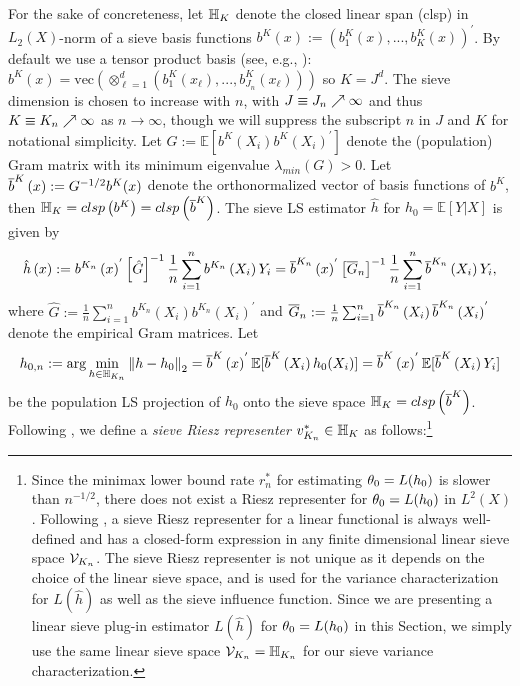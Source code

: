 \documentclass[12pt,american]{article}
\theoremstyle{definition}
\theoremstyle{plain}
\theoremstyle{definition}
\theoremstyle{plain}
\theoremstyle{plain}
\theoremstyle{plain}
\theoremstyle{plain}
\theoremstyle{plain}
\newcommand{\E}{\mathbb{E}}
\newcommand{\norm}[1]{\left\| #1 \right\|}
\begin{document}
For the sake of concreteness, let ${\mathbb{H}}_{K}$ denote the closed linear span (clsp) in $L_2(X)$-norm of a sieve basis functions $b^{K}(x):=\left(b_{1}^{K}(x),...,b_{K}^{K}(x)\right)^{'}$. By default we use a tensor product basis (see, e.g., \cite{chen2007sieve}): $b^{K}(x)=\text{vec}\left(\otimes_{\ell=1}^{d}\left(b_{1}^{K}\left(x_{\ell}\right),...,b_{J_{n}}^{K}\left(x_{\ell}\right)\right)\right)$ so $K=J^d$. The sieve dimension is chosen to increase with $n$, with $J\equiv J_{n}\nearrow\infty$ and thus $K \equiv K_{n}\nearrow\infty$ as $n\to\infty$, though we will suppress
the subscript $n$ in $J$ and $K$ for notational simplicity. Let $G:=\E\left[b^{K}\left(X_{i}\right)b^{K}\left(X_{i}\right)^{'}\right]$ denote the (population) Gram matrix with its minimum eigenvalue $\lambda_{min} (G)>0$. Let $\overline{b}^{K}\left(x\right):=G^{-1/2} b^K(x)$ denote the orthonormalized vector of basis functions of $b^K$, then ${\mathbb{H}}_{K}=clsp\left (b^K\right )=clsp \left(\overline{b}^K \right)$. The sieve LS estimator $\hat{h}$ for $h_0=\E[Y|X]$ is given by
\begin{equation}\label{eq:seriesLS}
  \hat{h}\left(x\right):=b^{K_{n}}\left(x\right)^{'}\left[\hat{G}\right]^{-1}\frac{1}{n}\sum_{i=1}^{n}  b^{K_{n}}\left(X_{i}\right)Y_{i}=\overline{b}^{K_{n}}\left(x\right)^{'}\left[{\overline{G}}_n\right]^{-1}\frac{1}{n}\sum_{i=1}^{n} \overline{b}^{K_{n}}\left(X_{i}\right)Y_{i},
\end{equation}
where $\hat{G}:=\frac{1}{n}\sum_{i=1}^{n} b^{K_{n}}\left(X_{i}\right) b^{K_{n}}\left(X_{i}\right)^{'}$ and ${\overline{G}}_n:=\frac{1}{n}\sum_{i=1}^{n} \overline{b}^{K_{n}}\left(X_{i}\right) \overline{b}^{K_{n}}\left(X_{i}\right)^{'}$ denote the empirical Gram matrices. Let
\[
  h_{0,n}:=\arg\min_{h\in \H_{K_{n}}}\norm{h-h_0}_2 = \ol b^{K}\left(x\right)^{'}\E[\ol b^{K}\left(X_i\right)h_0(X_i)]= \ol b^{K}\left(x\right)^{'}\E[\ol b^{K}\left(X_i\right)Y_i]
\]
be the population LS projection of $h_0$ onto the sieve space ${\mathbb{H}}_{K}=clsp \left(\overline{b}^K \right)$. Following \citet*{chen2014sieve}, we define a \textit{sieve Riesz representer} $v_{K_n}^{*}\in{\mathbb{H}}_{K}$ as follows:\footnote{Since the minimax lower bound rate $r^*_n$ for estimating $\theta_0=L(h_0)$ is slower than $n^{-1/2}$, there does not exist a Riesz representer for $\theta_0=L(h_0)$ in $L^2(X)$. Following \citet*{chen2014sieve}, a sieve Riesz representer for a linear functional is always well-defined and has a closed-form expression in any finite dimensional linear sieve space ${\cal V}_{K_n}$. The sieve Riesz representer is not unique as it depends on the choice of the linear sieve space, and is used for the variance characterization for $L(\hat{h})$ as well as the sieve influence function. Since we are presenting a linear sieve plug-in estimator $L(\hat{h})$ for $\theta_0=L(h_0)$ in this Section, we simply use the same linear sieve space ${\cal V}_{K_n}={\mathbb{H}}_{K_n}$ for our sieve variance characterization.}
\end{document}
